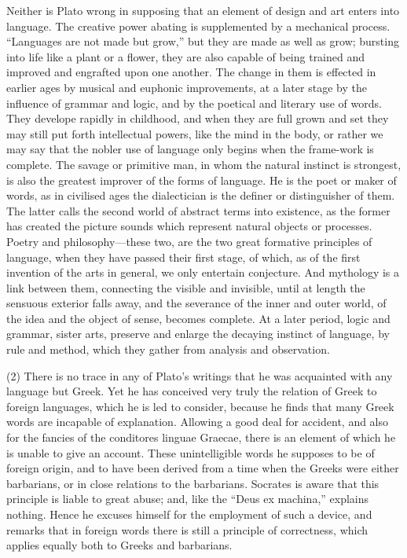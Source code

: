 \documentclass[11pt,letter]{article}
\begin{document}
\par  Neither is Plato wrong in supposing that an element of design and art enters into language. The creative power abating is supplemented by a mechanical process. “Languages are not made but grow,” but they are made as well as grow; bursting into life like a plant or a flower, they are also capable of being trained and improved and engrafted upon one another. The change in them is effected in earlier ages by musical and euphonic improvements, at a later stage by the influence of grammar and logic, and by the poetical and literary use of words. They develope rapidly in childhood, and when they are full grown and set they may still put forth intellectual powers, like the mind in the body, or rather we may say that the nobler use of language only begins when the frame-work is complete. The savage or primitive man, in whom the natural instinct is strongest, is also the greatest improver of the forms of language. He is the poet or maker of words, as in civilised ages the dialectician is the definer or distinguisher of them. The latter calls the second world of abstract terms into existence, as the former has created the picture sounds which represent natural objects or processes. Poetry and philosophy—these two, are the two great formative principles of language, when they have passed their first stage, of which, as of the first invention of the arts in general, we only entertain conjecture. And mythology is a link between them, connecting the visible and invisible, until at length the sensuous exterior falls away, and the severance of the inner and outer world, of the idea and the object of sense, becomes complete. At a later period, logic and grammar, sister arts, preserve and enlarge the decaying instinct of language, by rule and method, which they gather from analysis and observation.

\par  (2) There is no trace in any of Plato’s writings that he was acquainted with any language but Greek. Yet he has conceived very truly the relation of Greek to foreign languages, which he is led to consider, because he finds that many Greek words are incapable of explanation. Allowing a good deal for accident, and also for the fancies of the conditores linguae Graecae, there is an element of which he is unable to give an account. These unintelligible words he supposes to be of foreign origin, and to have been derived from a time when the Greeks were either barbarians, or in close relations to the barbarians. Socrates is aware that this principle is liable to great abuse; and, like the “Deus ex machina,” explains nothing. Hence he excuses himself for the employment of such a device, and remarks that in foreign words there is still a principle of correctness, which applies equally both to Greeks and barbarians.
\end{document}
